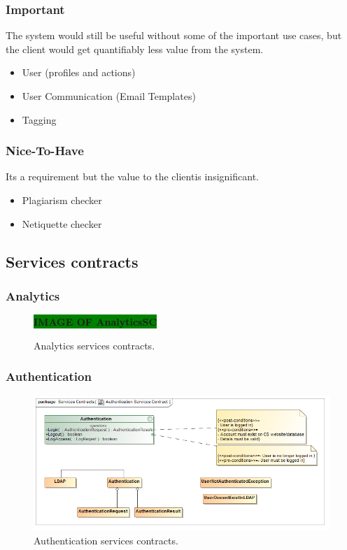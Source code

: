 \documentclass [a4paper,12pt] {article}
\begin{document}
	\subsubsection{Important}The system would still be useful without some of the important use cases, but the client would get quantifiably less value from the system.
		\begin{itemize}
			\item User (profiles and actions)
			\item User Communication (Email Templates)
			\item Tagging
		\end{itemize}
	\subsubsection{Nice-To-Have}Its a requirement but the value to the clientis insignificant.
		\begin{itemize}
			\item Plagiarism checker
			\item Netiquette checker
		\end{itemize}

\pagebreak
	\subsection{Services contracts}
		\subsubsection{Analytics}
			\begin{figure}[H]
				\centering
				\large\textbf{\colorbox{green}{IMAGE OF AnalyticsSC}}
				\caption{Analytics services contracts.}
			\end{figure}
		\subsubsection{Authentication}
			\begin{figure}[H]
						\centering
						\includegraphics[width=1.0\textwidth]{AuthenticationSC.png}
						\caption{Authentication services contracts.}
			\end{figure}
\end{document}
